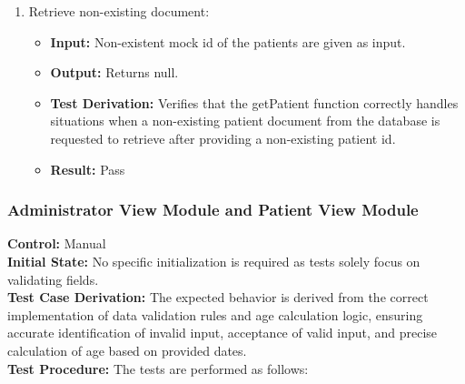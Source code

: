 \documentclass[12pt, titlepage]{article}
\begin{document}
\begin{enumerate}
    \item Retrieve non-existing document:
      \begin{itemize}
        \item \textbf{Input:} Non-existent mock id of the patients are given as input.  
        \item \textbf{Output:} Returns null. 
        \item \textbf{Test Derivation:} Verifies that the getPatient function correctly handles situations when a non-existing patient document from the database is requested to retrieve after providing a non-existing patient id.
        \item \textbf{Result:} Pass
      \end{itemize}
  \end{enumerate}

\subsubsection{Administrator View Module and Patient View Module}

  \textbf{Control:} Manual\\
  \textbf{Initial State:} No specific initialization is required as tests solely focus on validating fields.\\
  \textbf{Test Case Derivation:} The expected behavior is derived from the correct implementation of data validation rules and age calculation logic, ensuring accurate identification of invalid input, acceptance of valid input, and precise calculation of age based on provided dates.\\
  \textbf{Test Procedure:} The tests are performed as follows:\\
\end{document}
